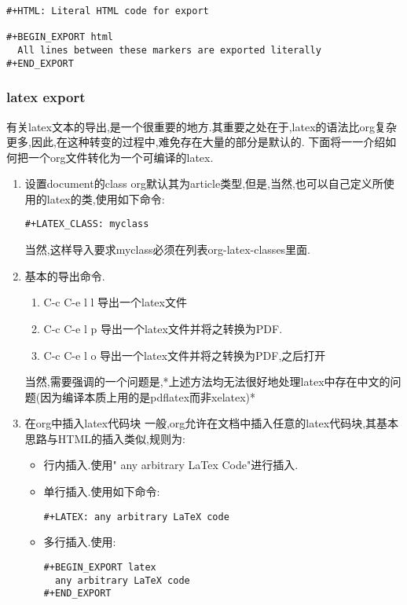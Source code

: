 \documentclass[10pt,a4paper]{article}
\begin{document}
\begin{verbatim}
#+HTML: Literal HTML code for export

#+BEGIN_EXPORT html
  All lines between these markers are exported literally
#+END_EXPORT
\end{verbatim}

\subsubsection{latex export}
\label{sec:org42fe6ed}
有关latex文本的导出,是一个很重要的地方.其重要之处在于,latex的语法比org复杂更多,因此,在这种转变的过程中,难免存在大量的部分是默认的.
下面将一一介绍如何把一个org文件转化为一个可编译的latex.
\begin{enumerate}
\item 设置document的class
\label{sec:org6108b6c}
org默认其为article类型,但是,当然,也可以自己定义所使用的latex的类,使用如下命令:
\begin{verbatim}
#+LATEX_CLASS: myclass
\end{verbatim}
当然,这样导入要求myclass必须在列表org-latex-classes里面.

\item 基本的导出命令.
\label{sec:orgb2a64a4}
\begin{enumerate}
\item C-c C-e l l 导出一个latex文件
\item C-c C-e l p 导出一个latex文件并将之转换为PDF.
\item C-c C-e l o 导出一个latex文件并将之转换为PDF,之后打开
\end{enumerate}
当然,需要强调的一个问题是,*上述方法均无法很好地处理latex中存在中文的问题(因为编译本质上用的是pdflatex而非xelatex)*
\item 在org中插入latex代码块
\label{sec:org8d4b283}
一般,org允许在文档中插入任意的latex代码块,其基本思路与HTML的插入类似,规则为:
\begin{itemize}
\item 行内插入.使用" any arbitrary LaTex Code"进行插入.
\item 单行插入.使用如下命令:
\begin{verbatim}
#+LATEX: any arbitrary LaTeX code
\end{verbatim}
\item 多行插入.使用:
\begin{verbatim}
#+BEGIN_EXPORT latex
  any arbitrary LaTeX code
#+END_EXPORT
\end{verbatim}
\end{itemize}
\end{enumerate}
\end{document}
